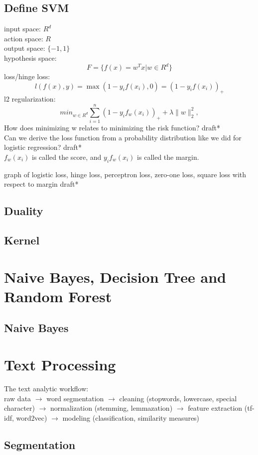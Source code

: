\documentclass{report}
\begin{document}
\section{Define SVM}

input space: $R^d$ \\
action space: $R$ \\
output space: $\{-1, 1\}$\\
hypothesis space: \[ F = \{ f(x) = w^T x | w \in R^d\}\]
loss/hinge loss: \[ l\left( f(x), y \right) = \max(1 - y_if(x_i), 0) = \left( 1 - y_if(x_i) \right)_+ \]
l2 regularization: \[
	min_{w \in R^d}\sum_{i=1}^{n} \left( 1 -y_if_w(x_i) \right)_+ + \lambda\|w\|_2^2 
,\] 
How does minimizing w relates to minimizing the risk function? draft*\\
Can we derive the loss function from a probability distribution like we did for logistic regression? draft*\\
$f_w(x_i)$ is called the score, and $y_if_w(x_i)$ is called the margin.

graph of logistic loss, hinge loss, perceptron loss, zero-one loss, square loss with respect to margin draft*
\section{Duality}
\section{Kernel}
\chapter{Naive Bayes, Decision Tree and Random Forest}
\section{Naive Bayes}

\chapter{Text Processing}
The text analytic workflow: \\ \linebreak
raw data $\rightarrow$ word segmentation $\rightarrow$ cleaning (stopwords, lowercase, special character) $\rightarrow$ normalization (stemming, lemmazation) $\rightarrow$ feature extraction (tf-idf, word2vec) $\rightarrow$ modeling (classification, similarity measures)

\section{Segmentation}
\end{document}
